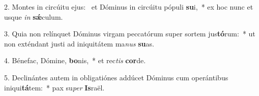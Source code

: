 2. Montes in circúitu ejus: \dag\  et Dóminus in circúitu pópuli \textbf{su}i,~*  ex hoc nunc et usque \textit{in} \textbf{sǽ}culum.\

3. Quia non relínquet Dóminus virgam peccatórum super sortem jus\textbf{tó}rum:~*  ut non exténdant justi ad iniquitátem ma\textit{nus} \textbf{su}as.\

4. Bénefac, Dómine, \textbf{bo}nis,~*  et rec\textit{tis} \textbf{cor}de.\

5. Declinántes autem in obligatiónes addúcet Dóminus cum operántibus iniqui\textbf{tá}tem:~*  pax su\textit{per} \textbf{Is}raël.\

